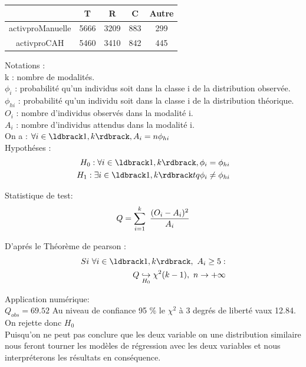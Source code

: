 \documentclass{book}
\begin{document}
\begin{center}
\setlength\arrayrulewidth{.5pt}
\begin{tabular}{|c||c|c|c|c|}
\hline
	& T & R & C & Autre\\
\hline
\hline
activproManuelle & 5666 & 3209 & 883 & 299\\
\hline
activproCAH & 5460 & 3410 & 842 & 445\\
\hline
\end{tabular}
\end{center}
\noindent
Notations : \\
k : nombre de modalités.\\
$\phi_i$ : probabilité qu'un individus soit dans la classe i de la distribution observée.\\ 
$\phi_{hi}$ : probabilité qu'un individu soit dans la classe i de la distribution théorique.\\
$O_i$ : nombre d'individus observés dans la modalité i.\\
$A_i$ : nombre d'individus attendus dans la modalité i.\\
On a : $\forall i \in \ldbrack 1,k \rdbrack , A_i = n \phi_{hi}$\\

\noindent
Hypothéses :
\begin{equation}
\begin{split}
H_0 : \forall i \in \ldbrack 1,k \rdbrack ,\phi_i = \phi_{hi}\\
H_1 : \exists i \in \ldbrack 1,k \rdbrack tq \phi_i \neq \phi_{hi}
\end{split}
\end{equation}

\noindent
Statistique de test:
\begin{equation}
Q = \sum_{i=1}^k ~{{(O_i - A _i)^2} \over {A_i}}
\end{equation}

\noindent
D'aprés le Théorème de pearson : 
\begin{equation}
\begin{split}
Si ~\forall i  \in \ldbrack 1,k \rdbrack, ~ A_i \geq 5 :\\
Q \underset {\small{H_0}}{\hookrightarrow} \chi ^{2} (k-1) , ~ n \rightarrow +\infty
\end{split}
\end{equation}

\noindent
Application numérique: \\
 $Q_{obs} = 69.52$ 
Au niveau de confiance 95 \% le $\chi ^2$ à 3 degrés de liberté vaux 12.84.\\
On rejette donc $H_0$
\\
\noindent
Puisqu'on ne peut pas conclure que les deux variable on une distribution similaire nous feront tourner les modèles de régression avec les deux variables et nous interpréterons les résultats en conséquence.\\
\end{document}

